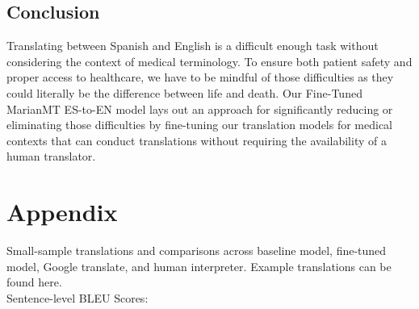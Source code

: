 \documentclass{article}
\begin{document}
\begin{multicols}{2}
\columnbreak

\section{Conclusion}
Translating between Spanish and English is a difficult enough task without considering the context of medical terminology. To ensure both patient safety and proper access to healthcare, we have to be mindful of those difficulties as they could literally be the difference between life and death. Our Fine-Tuned MarianMT ES-to-EN model lays out an approach for significantly reducing or eliminating those difficulties by fine-tuning our translation models for medical contexts that can conduct translations without requiring the availability of a human translator.
\end{multicols}

\pagebreak

\section{Appendix}
Small-sample translations and comparisons across baseline model, fine-tuned model, Google translate, and human interpreter. Example translations can be found here.\\

Sentence-level BLEU Scores:\\
\end{document}
